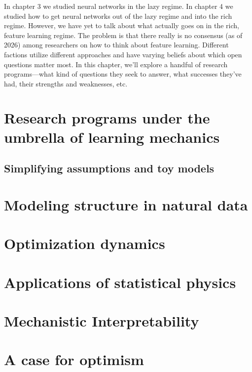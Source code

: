 In chapter 3 we studied neural networks in the lazy regime.
In chapter 4 we studied how to get neural networks out of the lazy regime
and into the rich regime. 
However, we have yet to talk about what actually goes on in the rich,
feature learning regime. 
The problem is that there really is no consensus (as of 2026) among researchers
on how to think about feature learning. 
Different factions utilize different approaches and have varying beliefs about which open 
questions matter most.
In this chapter, we'll explore a handful of research programs---what kind of questions
they seek to answer, what successes they've had, their strengths and weaknesses, etc.

\section{Research programs under the umbrella of learning mechanics}

\subsection{Simplifying assumptions and toy models}

\section{Modeling structure in natural data}

\section{Optimization dynamics}

\section{Applications of statistical physics}

\section{Mechanistic Interpretability}

\section{A case for optimism}